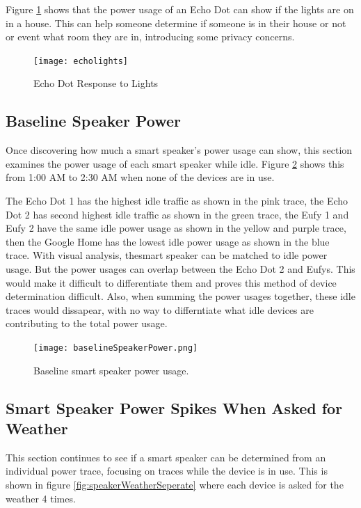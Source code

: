 Figure \ref{fig:echolights} shows that the power usage of an Echo Dot can show if the lights are on in a house. This can help someone determine if someone is in their house or not or event what room they are in, introducing some privacy concerns.

\begin{figure}[H]
    \centering
    \texttt{[image: echolights]}
    \caption{Echo Dot Response to Lights}
    \label{fig:echolights}
\end{figure}

\subsection{Baseline Speaker Power}
\label{Baseline Speaker Power}
Once discovering how much a smart speaker's power usage can show, this section examines the power usage of each smart speaker while idle. Figure \ref{fig:baselineSpeakerPower} shows this from 1:00 AM to 2:30 AM when none of the devices are in use.

The Echo Dot 1 has the highest idle traffic as shown in the pink trace, the Echo Dot 2 has second highest idle traffic as shown in the green trace, the Eufy 1 and Eufy 2 have the same idle power usage as shown in the yellow and purple trace, then the Google Home has the lowest idle power usage as shown in the blue trace. With visual analysis, thesmart speaker can be matched to idle power usage. But the power usages can overlap between the Echo Dot 2 and Eufys. This would make it difficult to differentiate them and proves this method of device determination difficult. Also, when summing the power usages together, these idle traces would dissapear, with no way to differntiate what idle devices are contributing to the total power usage.

\begin{figure}[H]
    \centering
    \texttt{[image: baselineSpeakerPower.png]}
    \caption{Baseline smart speaker power usage.}
    \label{fig:baselineSpeakerPower}
\end{figure}

\subsection{Smart Speaker Power Spikes When Asked for Weather}
\label{Smart Speaker Power Spikes When Asked for Weather}
This section continues to see if a smart speaker can be determined from an individual power trace, focusing on traces while the device is in use. This is shown in figure \ref{fig:speakerWeatherSeperate} where each device is asked for the weather 4 times.

